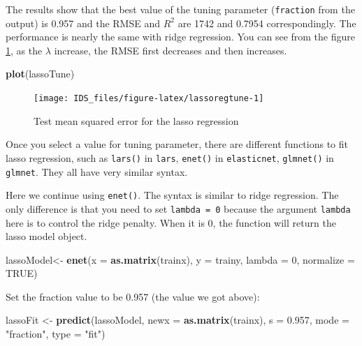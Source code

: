 \documentclass[12pt,]{krantz}
\makeatletter
\newenvironment{Shaded}{\begin{snugshade}}{\end{snugshade}}
\newcommand{\DataTypeTok}[1]{\textcolor[rgb]{0.27,0.27,0.27}{#1}}
\newcommand{\DecValTok}[1]{\textcolor[rgb]{0.06,0.06,0.06}{#1}}
\newcommand{\FloatTok}[1]{\textcolor[rgb]{0.06,0.06,0.06}{#1}}
\newcommand{\KeywordTok}[1]{\textcolor[rgb]{0.27,0.27,0.27}{\textbf{#1}}}
\newcommand{\NormalTok}[1]{#1}
\newcommand{\OtherTok}[1]{\textcolor[rgb]{0.37,0.37,0.37}{#1}}
\newcommand{\StringTok}[1]{\textcolor[rgb]{0.5,0.5,0.5}{#1}}
\newenvironment{kframe}{%
\medskip{}
\setlength{\fboxsep}{.8em}
 \def\at@end@of@kframe{}%
 \ifinner\ifhmode%
  \def\at@end@of@kframe{\end{minipage}}%
  \begin{minipage}{\columnwidth}%
 \fi\fi%
 \def\FrameCommand##1{\hskip\@totalleftmargin \hskip-\fboxsep
 \colorbox{shadecolor}{##1}\hskip-\fboxsep
     \hskip-\linewidth \hskip-\@totalleftmargin \hskip\columnwidth}%
 \MakeFramed {\advance\hsize-\width
   \@totalleftmargin\z@ \linewidth\hsize
   \@setminipage}}%
 {\par\unskip\endMakeFramed%
 \at@end@of@kframe}
\renewenvironment{Shaded}{\begin{kframe}}{\end{kframe}}
\makeatother
\begin{document}
The results show that the best value of the tuning parameter (\texttt{fraction} from the output) is 0.957 and the RMSE and \(R^{2}\) are 1742 and 0.7954 correspondingly. The performance is nearly the same with ridge regression. You can see from the figure \ref{fig:lassoregtune}, as the \(\lambda\) increase, the RMSE first decreases and then increases.

\begin{Shaded}
\begin{Highlighting}[]
\KeywordTok{plot}\NormalTok{(lassoTune)}
\end{Highlighting}
\end{Shaded}

\begin{figure}

{\centering \texttt{[image: IDS\_files/figure-latex/lassoregtune-1]} 

}

\caption{Test mean squared error for the lasso regression}\label{fig:lassoregtune}
\end{figure}

Once you select a value for tuning parameter, there are different functions to fit lasso regression, such as \texttt{lars()} in \texttt{lars}, \texttt{enet()} in \texttt{elasticnet}, \texttt{glmnet()} in \texttt{glmnet}. They all have very similar syntax.

Here we continue using \texttt{enet()}. The syntax is similar to ridge regression. The only difference is that you need to set \texttt{lambda\ =\ 0} because the argument \texttt{lambda} here is to control the ridge penalty. When it is 0, the function will return the lasso model object.

\begin{Shaded}
\begin{Highlighting}[]
\NormalTok{lassoModel<-}\StringTok{ }\KeywordTok{enet}\NormalTok{(}\DataTypeTok{x =} \KeywordTok{as.matrix}\NormalTok{(trainx), }\DataTypeTok{y =}\NormalTok{ trainy, }\DataTypeTok{lambda =} \DecValTok{0}\NormalTok{, }\DataTypeTok{normalize =} \OtherTok{TRUE}\NormalTok{)}
\end{Highlighting}
\end{Shaded}

Set the fraction value to be 0.957 (the value we got above):

\begin{Shaded}
\begin{Highlighting}[]
\NormalTok{lassoFit <-}\StringTok{ }\KeywordTok{predict}\NormalTok{(lassoModel, }\DataTypeTok{newx =} \KeywordTok{as.matrix}\NormalTok{(trainx), }\DataTypeTok{s =} \FloatTok{0.957}\NormalTok{, }\DataTypeTok{mode =} \StringTok{"fraction"}\NormalTok{, }\DataTypeTok{type =} \StringTok{"fit"}\NormalTok{)}
\end{Highlighting}
\end{Shaded}
\end{document}
